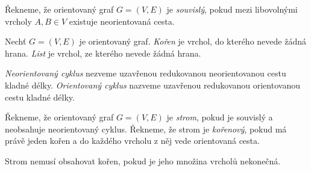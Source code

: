 

\begin{definice}
    Řekneme, že orientovaný graf $G=(V,E)$ je \emph{souvislý}, pokud mezi libovolnými vrcholy $A, B \in V$ existuje neorientovaná cesta.
\end{definice}

\begin{definice}
    Nechť $G = (V, E)$ je orientovaný graf. \emph{Kořen} je vrchol, do kterého nevede žádná hrana. \emph{List} je vrchol, ze kterého nevede žádná hrana.
\end{definice}

\begin{definice}[Cyklus]
    \emph{Neorientovaný cyklus} nezveme uzavřenou redukovanou neorientovanou cestu kladné délky.
    \emph{Orientovaný cyklus} nazveme uzavřenou redukovanou orientovanou cestu kladné délky.
\end{definice}

\begin{definice}[Strom]
    Řekneme, že orientovaný graf $G=(V,E)$ je \emph{strom}, pokud je souvislý a neobsahuje neorientovaný cyklus. Řekneme, že strom je \emph{kořenový}, pokud má právě jeden kořen a do každého vrcholu z něj vede orientovaná cesta. 
\end{definice}
\begin{pozn}
    Strom nemusí obsahovat kořen, pokud je jeho množina vrcholů nekonečná. 
\end{pozn}

